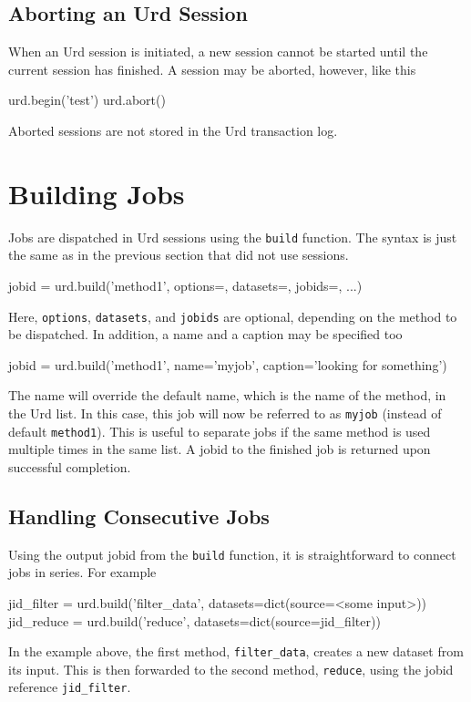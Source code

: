 \subsection{Aborting an Urd Session}

When an Urd session is initiated, a new session cannot be started
until the current session has finished.  A session may be aborted,
however, like this
\begin{python}
urd.begin('test')
urd.abort()
\end{python}
Aborted sessions are not stored in the Urd transaction log.




\section{Building Jobs}

Jobs are dispatched in Urd sessions using the \texttt{build} function.
The syntax is just the same as in the previous section that did not
use sessions.
\begin{python}
jobid = urd.build('method1', options={}, datasets={}, jobids={}, ...)
\end{python}
Here, \texttt{options}, \texttt{datasets}, and \texttt{jobids} are
optional, depending on the method to be dispatched.  In addition, a
name and a caption may be specified too
\begin{python}
jobid = urd.build('method1', name='myjob', caption='looking for something')
\end{python}
The name will override the default name, which is the name of the
method, in the Urd list.  In this case, this job will now be referred
to as \texttt{myjob} (instead of default \texttt{method1}).  This is
useful to separate jobs if the same method is used multiple times in
the same list.  A jobid to the finished job is returned upon
successful completion.



\subsection{Handling Consecutive Jobs}

Using the output jobid from the \texttt{build} function, it is
straightforward to connect jobs in series.  For example
\begin{python}
jid_filter = urd.build('filter_data', datasets=dict(source=<some input>))
jid_reduce = urd.build('reduce', datasets=dict(source=jid_filter))
\end{python}
In the example above, the first method, \texttt{filter\_data}, creates
a new dataset from its input.  This is then forwarded to the second
method, \texttt{reduce}, using the jobid reference
\texttt{jid\_filter}.

